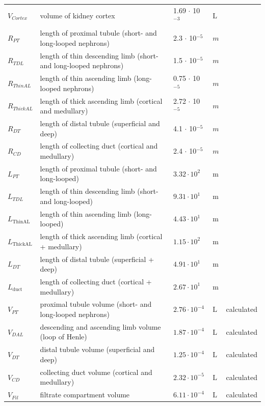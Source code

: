 \documentclass[preprint,12pt,authoryear]{elsarticle}
\begin{document}
\begin{longtable}{P{2cm}P{3.5cm}P{2cm}P{1cm}P{2.5cm}}
\midrule\midrule

$V_{Cortex}$ & volume of kidney cortex & 1.69 $\cdot$ 10$^{-3}$ & $\text{L}$ & \citep{gazzard_2025} \\

$R_{PT}$ & length of proximal tubule (short- and long-looped nephrons) & 2.3 $\cdot$ 10$^{-5}$ & $m$ & \citep{gilmer_2018} \\
$R_{TDL}$ & length of thin descending limb (short- and long-looped nephrons) & 1.5 $\cdot$ 10$^{-5}$ & $m$ & \citep{gilmer_2018} \\
$R_{ThinAL}$ & length of thin ascending limb (long-looped nephrons) & 0.75 $\cdot$ 10$^{-5}$ & $m$ & \citep{gilmer_2018} \\
$R_{ThickAL}$ & length of thick ascending limb (cortical and medullary) & 2.72 $\cdot$ 10$^{-5}$ & $m$ & \citep{gilmer_2018} \\
$R_{DT}$ & length of distal tubule (superficial and deep) & 4.1 $\cdot$ 10$^{-5}$ & $m$ & \citep{gilmer_2018} \\
$R_{CD}$ & length of collecting duct (cortical and medullary) & 2.4 $\cdot$ 10$^{-5}$ & $m$ & \citep{gilmer_2018} \\

$L_{PT}$ & length of proximal tubule (short- and long-looped) & $3.32 \cdot 10^{2}$ & $\text{m}$ & \citep{gilmer_2018} \\
$L_{TDL}$ & length of thin descending limb (short- and long-looped) & $9.31 \cdot 10^{1}$ & $\text{m}$ & \citep{gilmer_2018} \\
$L_{\text{ThinAL}}$ & length of thin ascending limb (long-looped) & $4.43 \cdot 10^{1}$ & $\text{m}$ & \citep{gilmer_2018} \\
$L_{\text{ThickAL}}$ & length of thick ascending limb (cortical + medullary) & $1.15 \cdot 10^{2}$ & $\text{m}$ & \citep{gilmer_2018} \\
$L_{DT}$ & length of distal tubule (superficial + deep) & $4.91 \cdot 10^{1}$ & $\text{m}$ & \citep{gilmer_2018} \\
$L_{\text{duct}}$ & length of collecting duct (cortical + medullary) & $2.67 \cdot 10^{1}$ & $\text{m}$ & \citep{gilmer_2018} \\

$V_{PT}$ & proximal tubule volume (short- and long-looped nephrons) & $2.76 \cdot 10^{-4}$ & $\text{L}$ & calculated \\
$V_{DAL}$ & descending and ascending limb volume (loop of Henle) & $1.87 \cdot 10^{-4}$ & $\text{L}$ & calculated \\
$V_{DT}$ & distal tubule volume (superficial and deep) & $1.25 \cdot 10^{-4}$ & $\text{L}$ & calculated \\
$V_{CD}$ & collecting duct volume (cortical and medullary) & $2.32 \cdot 10^{-5}$ & $\text{L}$ & calculated \\
$V_{Fil}$ & filtrate compartment volume & $6.11 \cdot 10^{-4}$ & $\text{L}$ & calculated \\



\end{longtable}
\end{document}
